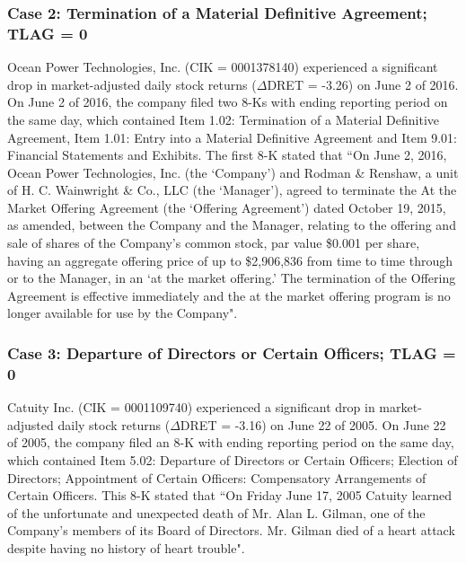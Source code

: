 \begin{small}
\subsubsection*{Case 2: Termination of a Material Definitive Agreement; TLAG = 0}
Ocean Power Technologies, Inc. (CIK = 0001378140) experienced a significant drop in market-adjusted daily stock returns ($\Delta$DRET = -3.26) on June 2 of 2016. On June 2 of 2016, the company filed two 8-Ks with ending reporting period on the same day, which contained Item 1.02: Termination of a Material Definitive Agreement, Item 1.01: Entry into a Material Definitive Agreement and Item 9.01: Financial Statements and Exhibits. The first 8-K stated that ``On June 2, 2016, Ocean Power Technologies, Inc. (the `Company') and Rodman \& Renshaw, a unit of H. C. Wainwright \& Co., LLC (the `Manager'), agreed to terminate the At the Market Offering Agreement (the `Offering Agreement') dated October 19, 2015, as amended, between the Company and the Manager, relating to the offering and sale of shares of the Company’s common stock, par value \$0.001 per share, having an aggregate offering price of up to \$2,906,836 from time to time through or to the Manager, in an `at the market offering.' The termination of the Offering Agreement is effective immediately and the at the market offering program is no longer available for use by the Company".
\subsubsection*{Case 3: Departure of Directors or Certain Officers; TLAG = 0}
Catuity Inc. (CIK = 0001109740) experienced a significant drop in market-adjusted daily stock returns ($\Delta$DRET = -3.16) on June 22 of 2005. On June 22 of 2005, the company filed an 8-K with ending reporting period on the same day, which contained Item 5.02: Departure of Directors or Certain Officers; Election of Directors; Appointment of Certain Officers: Compensatory Arrangements of Certain Officers. This 8-K stated that ``On Friday June 17, 2005 Catuity learned of the unfortunate and unexpected death of Mr. Alan L. Gilman, one of the Company's members of its Board of Directors. Mr. Gilman died of a heart attack despite having no history of heart trouble". 

\end{small}
